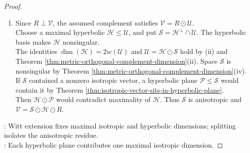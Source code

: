 \begin{theorem}
\begin{proof}
\begin{enumerate}[label=(\roman*)]
Since $\operatorname{rad}(\mathcal{M})=\mathcal{M}$, a hyperbolic completion $\mathcal{H}_0\supseteq\mathcal{M}$ with $\dim(\mathcal{H}_0)=2w(\mathcal{V})$ exists by Theorem \ref{thm:nonsingular-completions-hyperbolic-extensions}(i).\\
Suppose that a maximal hyperbolic $\mathcal{H}$ has dimension $2k<2w(\mathcal{V})$, and choose the span $\mathcal{H}_1\leq\mathcal{H}_0$ of $k$ hyperbolic pairs.\\
Matching hyperbolic bases defines an isometry $\mathcal{H}\to\mathcal{H}_1$. Fix an extension $\Phi\in\mathcal{O}(\mathcal{V})$ by Theorem \ref{thm:witt-extension-theorem-metric-spaces}.\\
Then $\mathcal{H}\subsetneq\Phi^{-1}\mathcal{H}_0$, contrary to maximality. Therefore $\dim(\mathcal{H})=2w(\mathcal{V})$.
\item[$(iii)$] Since $R\perp\mathcal{V}$, the assumed complement satisfies $\mathcal{V}=R\odot\mathcal{U}$.\\
Choose a maximal hyperbolic $\mathcal{H}\leq\mathcal{U}$, and put $\mathcal{S}=\mathcal{H}^{\perp}\cap\mathcal{U}$. The hyperbolic basis makes $\mathcal{H}$ nonsingular.\\
The identities $\dim(\mathcal{H})=2w(\mathcal{U})$ and $\mathcal{U}=\mathcal{H}\odot\mathcal{S}$ hold by (ii) and Theorem \ref{thm:metric-orthogonal-complement-dimension}(ii). Space $\mathcal{S}$ is nonsingular by Theorem \ref{thm:metric-orthogonal-complement-dimension}(iv).\\
If $\mathcal{S}$ contained a nonzero isotropic vector, a hyperbolic plane $\mathcal{P}\leq\mathcal{S}$ would contain it by Theorem \ref{thm:isotropic-vector-sits-in-hyperbolic-plane}.\\
Then $\mathcal{H}\odot\mathcal{P}$ would contradict maximality of $\mathcal{H}$. Thus $\mathcal{S}$ is anisotropic and $\mathcal{V}=\mathcal{S}\odot\mathcal{H}\odot R$.
\end{enumerate}
: Witt extension fixes maximal isotropic and hyperbolic dimensions; splitting isolates the anisotropic residue.\\
: Each hyperbolic plane contributes one maximal isotropic dimension.
\end{proof}
\end{theorem}
